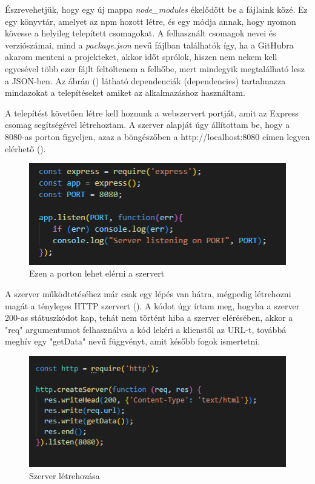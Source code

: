 Észrevehetjük, hogy egy új mappa \emph{node\_modules} ékelődött be a fájlaink közé. Ez egy könyvtár, amelyet az npm hozott létre, és egy módja annak, hogy nyomon kövesse a helyileg telepített csomagokat. A felhasznált csomagok nevei és verziószámai, mind a \emph{package.json} nevű fájlban találhatók így, ha a GitHubra akarom menteni a projekteket, akkor időt sprólok, hiszen nem nekem kell egyesével több ezer fájlt feltöltenem a felhőbe, mert mindegyik megtalálható lesz a JSON-ben. Az ábrán () látható dependenciák (dependencies) tartalmazza mindazokat a telepítéseket amiket az alkalmazáshoz használtam.

	A telepítést követően létre kell hoznunk a webszervert portját, amit az Express csomag segítségével létrehoztam. A szerver alapját úgy állítottam be, hogy a 8080-as porton figyeljen, azaz a böngészőben a http://localhost:8080 címen legyen elérhető ().

\begin{figure}[h]
\centering
\includegraphics[scale=0.9]{images/serverPort.png}
\caption{Ezen a porton lehet elérni a szervert}
\label{fig:serverPort}
\end{figure}

\pagebreak

A szerver működtetéséhez már csak egy lépés van hátra, mégpedig létrehozni magát a tényleges HTTP szervert (). A kódot úgy írtam meg, hogyha a szerver 200-as státuszkódot kap, tehát nem történt hiba a szerver elérésében, akkor a "req" argumentumot felhasználva a kód lekéri a klienstől az URL-t, továbbá meghív egy "getData" nevű függvényt, amit később fogok ismertetni. \cite{nodeServer}

\begin{figure}[h]
\centering
\includegraphics[scale=1]{images/createServer.png}
\caption{Szerver létrehozása}
\label{fig:createServer}
\end{figure}

